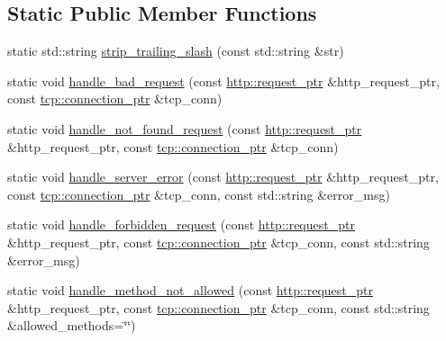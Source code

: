 \subsection*{Static Public Member Functions}
\begin{DoxyCompactItemize}
\item 
static std\-::string \hyperlink{classpion_1_1http_1_1server_a375e54d0970e5d3dfc0eb50f902cf4c9}{strip\-\_\-trailing\-\_\-slash} (const std\-::string \&str)
\item 
static void \hyperlink{classpion_1_1http_1_1server_a32e2b0b6936fe56f78bc8bdc4b03786c}{handle\-\_\-bad\-\_\-request} (const \hyperlink{namespacepion_1_1http_ace432b70a9459d50ff4969a7a47f0ccb}{http\-::request\-\_\-ptr} \&http\-\_\-request\-\_\-ptr, const \hyperlink{namespacepion_1_1tcp_a6c9b7497068009f6d81d95ec0b0627d6}{tcp\-::connection\-\_\-ptr} \&tcp\-\_\-conn)
\item 
static void \hyperlink{classpion_1_1http_1_1server_a774691f785de05231a90a9975a4bc7e4}{handle\-\_\-not\-\_\-found\-\_\-request} (const \hyperlink{namespacepion_1_1http_ace432b70a9459d50ff4969a7a47f0ccb}{http\-::request\-\_\-ptr} \&http\-\_\-request\-\_\-ptr, const \hyperlink{namespacepion_1_1tcp_a6c9b7497068009f6d81d95ec0b0627d6}{tcp\-::connection\-\_\-ptr} \&tcp\-\_\-conn)
\item 
static void \hyperlink{classpion_1_1http_1_1server_a912a8d3d7754f8a3c1433b079e606871}{handle\-\_\-server\-\_\-error} (const \hyperlink{namespacepion_1_1http_ace432b70a9459d50ff4969a7a47f0ccb}{http\-::request\-\_\-ptr} \&http\-\_\-request\-\_\-ptr, const \hyperlink{namespacepion_1_1tcp_a6c9b7497068009f6d81d95ec0b0627d6}{tcp\-::connection\-\_\-ptr} \&tcp\-\_\-conn, const std\-::string \&error\-\_\-msg)
\item 
static void \hyperlink{classpion_1_1http_1_1server_aa3b21b862df05cd2d0ccb12ae9659d68}{handle\-\_\-forbidden\-\_\-request} (const \hyperlink{namespacepion_1_1http_ace432b70a9459d50ff4969a7a47f0ccb}{http\-::request\-\_\-ptr} \&http\-\_\-request\-\_\-ptr, const \hyperlink{namespacepion_1_1tcp_a6c9b7497068009f6d81d95ec0b0627d6}{tcp\-::connection\-\_\-ptr} \&tcp\-\_\-conn, const std\-::string \&error\-\_\-msg)
\item 
static void \hyperlink{classpion_1_1http_1_1server_a84802be9b0759de8d41cf5eca99b8b48}{handle\-\_\-method\-\_\-not\-\_\-allowed} (const \hyperlink{namespacepion_1_1http_ace432b70a9459d50ff4969a7a47f0ccb}{http\-::request\-\_\-ptr} \&http\-\_\-request\-\_\-ptr, const \hyperlink{namespacepion_1_1tcp_a6c9b7497068009f6d81d95ec0b0627d6}{tcp\-::connection\-\_\-ptr} \&tcp\-\_\-conn, const std\-::string \&allowed\-\_\-methods=\char`\"{}\char`\"{})
\end{DoxyCompactItemize}
